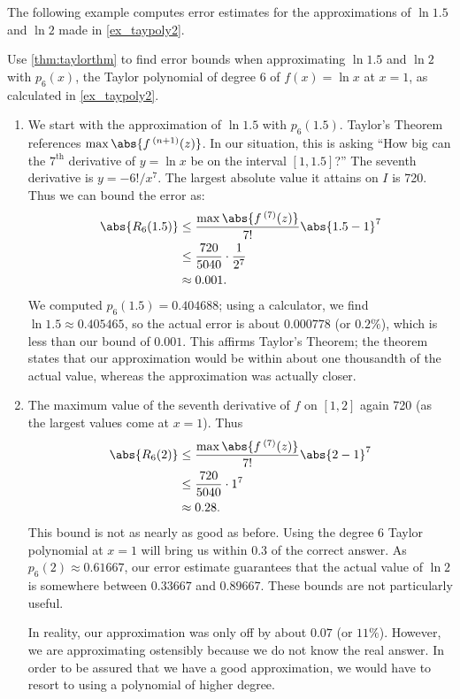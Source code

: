 The following example computes error estimates for the approximations of $\ln 1.5$ and $\ln 2$ made in \autoref{ex_taypoly2}.

\begin{example}\label{ex_taypoly3}
Use \autoref{thm:taylorthm} to find error bounds when approximating $\ln 1.5$ and $\ln 2$ with $p_6(x)$, the Taylor polynomial of degree 6 of $f(x)=\ln x$ at $x=1$, as calculated in \autoref{ex_taypoly2}.
\solution
\begin{enumerate}
\item	We start with the approximation of $\ln 1.5$ with $p_6(1.5)$.
%
Taylor's Theorem references $\max\abs{f\,^{(n+1)}(z)}$. In our situation, this is asking ``How big can the $7^\text{th}$ derivative of $y=\ln x$ be on the interval $[1,1.5]$?'' The seventh derivative is $y = -6!/x^7$. The largest absolute value it attains on $I$ is 720. Thus we can bound the error as:
\begin{align*}
	\abs{R_6(1.5)}
	&\leq \frac{\max\abs{f\,^{(7)}(z)}}{7!}\abs{1.5-1}^7\\
	&\leq \frac{720}{5040}\cdot\frac1{2^7}\\
	&\approx 0.001.
\end{align*}
We computed $p_6(1.5) = 0.404688$; using a calculator, we find $\ln 1.5 \approx 0.405465$, so the actual error is about $0.000778$ (or $0.2\%$), which is less than our bound of $0.001$. This affirms Taylor's Theorem; the theorem states that our approximation would be within about one thousandth of the actual value, whereas the approximation was actually closer.

	\item	%
	The maximum value of the seventh derivative of $f$ on $[1,2]$ %
	again 720 (as the largest values come at $x=1$). Thus 
\begin{align*}
	\abs{R_6(2)}
	&\leq \frac{\max\abs{f\,^{(7)}(z)}}{7!}\abs{2-1}^7\\
	&\leq \frac{720}{5040}\cdot1^7\\
	&\approx 0.28.
\end{align*}
This bound is not as nearly as good as before. Using the degree 6 Taylor polynomial at $x =1$ will bring us within 0.3 of the correct answer. As $p_6(2)\approx 0.61667$, our error estimate guarantees that the actual value of $\ln 2$ is somewhere between $0.33667$ and $0.89667$. These bounds are not particularly useful.

In reality, our approximation was only off by about $0.07$ (or $11\%$). However, we are approximating ostensibly because we do not know the real answer. In order to be assured that we have a good approximation, we would have to resort to using a polynomial of higher degree.
\end{enumerate}
\end{example}

